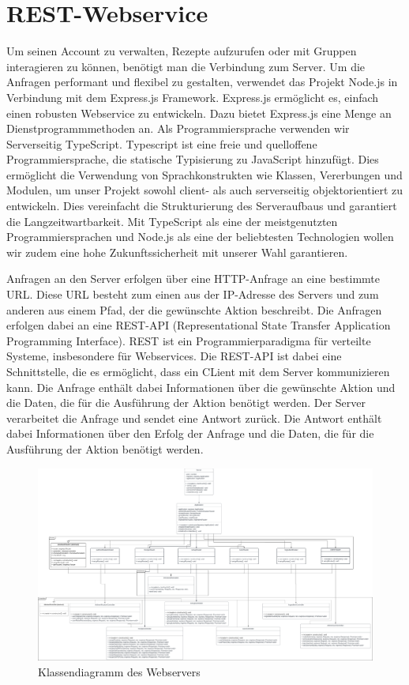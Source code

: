 \documentclass{entwurfsheft}
\begin{document}
\section{REST-Webservice}
Um seinen Account zu verwalten, Rezepte aufzurufen oder mit Gruppen interagieren zu können, benötigt man die Verbindung zum Server.
Um die Anfragen performant und flexibel zu gestalten, verwendet das Projekt Node.js in Verbindung mit dem Express.js Framework.
Express.js ermöglicht es, einfach einen robusten Webservice zu entwickeln. Dazu bietet Express.js eine Menge an Dienstprogrammmethoden an.
Als Programmiersprache verwenden wir Serverseitig TypeScript. Typescript ist eine freie und quelloffene Programmiersprache, die statische Typisierung zu JavaScript hinzufügt.
Dies ermöglicht die Verwendung von Sprachkonstrukten wie Klassen, Vererbungen und Modulen, um unser Projekt sowohl client- als auch serverseitig objektorientiert zu entwickeln.
Dies vereinfacht die Strukturierung des Serveraufbaus und garantiert die Langzeitwartbarkeit. Mit TypeScript als eine der meistgenutzten Programmiersprachen und Node.js als eine der beliebtesten Technologien wollen wir zudem eine hohe Zukunftssicherheit mit unserer Wahl garantieren.

Anfragen an den Server erfolgen über eine HTTP-Anfrage an eine bestimmte URL. Diese URL besteht zum einen aus der IP-Adresse des Servers und zum anderen aus einem Pfad, der die gewünschte Aktion beschreibt.
Die Anfragen erfolgen dabei an eine REST-API (Representational State Transfer Application Programming Interface). REST ist ein Programmierparadigma für verteilte Systeme, insbesondere für Webservices.
Die REST-API ist dabei eine Schnittstelle, die es ermöglicht, dass ein CLient mit dem Server kommunizieren kann.
Die Anfrage enthält dabei Informationen über die gewünschte Aktion und die Daten, die für die Ausführung der Aktion benötigt werden.
Der Server verarbeitet die Anfrage und sendet eine Antwort zurück.
Die Antwort enthält dabei Informationen über den Erfolg der Anfrage und die Daten, die für die Ausführung der Aktion benötigt werden.

\begin{figure}[htp]
    \centering
    \includegraphics[width = 1\textwidth]{images/webserver/webserver.pdf}
    \caption{Klassendiagramm des Webservers}
    \label{fig:webserver}
\end{figure}
\end{document}
